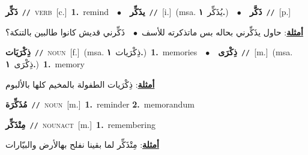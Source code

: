 \documentclass[10pt,a4paper,twoside]{article} %
\begin{document}
\begin{multicols}{2}
{{{{{\setlength\topsep{0pt}\textbf{\foreignlanguage{arabic}{ذَكِّر}}\ {\color{gray}\texttt{//}\color{black}}\ \textsc{verb}\ [c.]\ \textbf{1.}~remind\ \ $\bullet$\ \ \setlength\topsep{0pt}\textbf{\foreignlanguage{arabic}{يذَكِّر}}\ {\color{gray}\texttt{//}\color{black}}\ [i.]\ \color{gray}(msa. \foreignlanguage{arabic}{يُذَكِّر}~\foreignlanguage{arabic}{\textbf{١.}})\color{black}\ \ $\bullet$\ \ \setlength\topsep{0pt}\textbf{\foreignlanguage{arabic}{ذَكَّر}}\ {\color{gray}\texttt{//}\color{black}}\ [p.]\  \begin{flushright}\color{gray}\foreignlanguage{arabic}{\textbf{\underline{\foreignlanguage{arabic}{أمثلة}}}: حاول يذَكِّرني بحاله بس ماتذكرته للأسف\ $\bullet$\ \  ذَكِّرني قديش كانوا طالبين بالتنكة؟}\end{flushright}\color{black}} \vspace{2mm}

{\setlength\topsep{0pt}\textbf{\foreignlanguage{arabic}{ذِكْرَيَات}}\ {\color{gray}\texttt{//}\color{black}}\ \textsc{noun}\ [f.]\ \color{gray}(msa. \foreignlanguage{arabic}{ذِكْرَيات}~\foreignlanguage{arabic}{\textbf{١.}})\color{black}\ \textbf{1.}~memories\ \ $\bullet$\ \ \setlength\topsep{0pt}\textbf{\foreignlanguage{arabic}{ذِكْرَى}}\ {\color{gray}\texttt{//}\color{black}}\ [m.]\ \color{gray}(msa. \foreignlanguage{arabic}{ذِكْرَى}~\foreignlanguage{arabic}{\textbf{١.}})\color{black}\ \textbf{1.}~memory\  \begin{flushright}\color{gray}\foreignlanguage{arabic}{\textbf{\underline{\foreignlanguage{arabic}{أمثلة}}}: ذِكْرَيات الطفولة بالمخيم كلها بالألبوم}\end{flushright}\color{black}} \vspace{2mm}

{\setlength\topsep{0pt}\textbf{\foreignlanguage{arabic}{مُذَكِّرَة}}\ {\color{gray}\texttt{//}\color{black}}\ \textsc{noun}\ [m.]\ \textbf{1.}~reminder  \textbf{2.}~memorandum\ 

{\setlength\topsep{0pt}\textbf{\foreignlanguage{arabic}{مِتْذَكِّر}}\ {\color{gray}\texttt{//}\color{black}}\ \textsc{noun\textunderscore act}\ [m.]\ \textbf{1.}~remembering\  \begin{flushright}\color{gray}\foreignlanguage{arabic}{\textbf{\underline{\foreignlanguage{arabic}{أمثلة}}}: مِتْذَكِّر لما بقينا نفلح بهالأرض والبيّارات}\end{flushright}\color{black}} \vspace{2mm}

}}}}}
\end{multicols}
\end{document}
